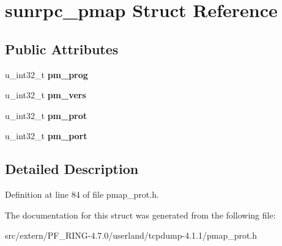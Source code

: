 \hypertarget{structsunrpc__pmap}{
\section{sunrpc\_\-pmap Struct Reference}
\label{structsunrpc__pmap}
}
\subsection*{Public Attributes}
\begin{DoxyCompactItemize}
\item 
\hypertarget{structsunrpc__pmap_acb9ad613d87338a1c089538468eaedf5}{
u\_\-int32\_\-t {\bfseries pm\_\-prog}}
\label{structsunrpc__pmap_acb9ad613d87338a1c089538468eaedf5}

\item 
\hypertarget{structsunrpc__pmap_a21f42b890318b756617c5898b00fdb42}{
u\_\-int32\_\-t {\bfseries pm\_\-vers}}
\label{structsunrpc__pmap_a21f42b890318b756617c5898b00fdb42}

\item 
\hypertarget{structsunrpc__pmap_a0cef6192babac7c66bf92e4f17707e5b}{
u\_\-int32\_\-t {\bfseries pm\_\-prot}}
\label{structsunrpc__pmap_a0cef6192babac7c66bf92e4f17707e5b}

\item 
\hypertarget{structsunrpc__pmap_aab02edcc98d013234352b0a3f6dea7be}{
u\_\-int32\_\-t {\bfseries pm\_\-port}}
\label{structsunrpc__pmap_aab02edcc98d013234352b0a3f6dea7be}

\end{DoxyCompactItemize}


\subsection{Detailed Description}


Definition at line 84 of file pmap\_\-prot.h.



The documentation for this struct was generated from the following file:\begin{DoxyCompactItemize}
\item 
src/extern/PF\_\-RING-\/4.7.0/userland/tcpdump-\/4.1.1/pmap\_\-prot.h\end{DoxyCompactItemize}

